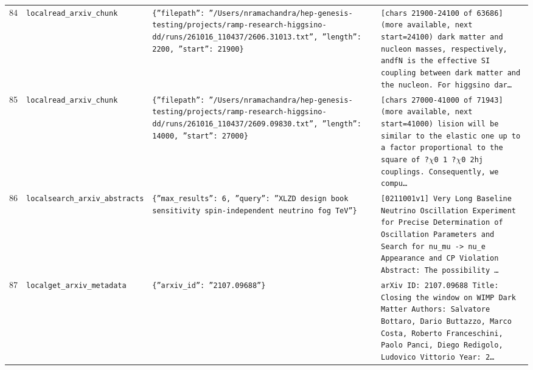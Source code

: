 \documentclass[11pt,a4paper]{article}
\begin{document}
\begin{longtable}{@{}p{}p{}p{}p{}@{}}
84 & \texttt{local}\newline\texttt{read\_\allowbreak{}arxiv\_\allowbreak{}chunk} & \texttt{\{''filepath'':\allowbreak{} ''/\allowbreak{}Users/\allowbreak{}nramachandra/\allowbreak{}hep-genesis-testing/\allowbreak{}projects/\allowbreak{}ramp-research-higgsino-dd/\allowbreak{}runs/\allowbreak{}261016\_\allowbreak{}110437/\allowbreak{}2606.31013.txt'',\allowbreak{} ''length'':\allowbreak{} 2200,\allowbreak{} ''start'':\allowbreak{} 21900\}\allowbreak{}} & \texttt{[chars 21900-24100 of 63686]\allowbreak{} (more available,\allowbreak{} next start=\allowbreak{}24100)\allowbreak{}   dark matter and nucleon masses,\allowbreak{} respectively,\allowbreak{} andfN is the effective SI coupling between dark matter and the nucleon. For higgsino dar\ldots{}\allowbreak{}} \\
85 & \texttt{local}\newline\texttt{read\_\allowbreak{}arxiv\_\allowbreak{}chunk} & \texttt{\{''filepath'':\allowbreak{} ''/\allowbreak{}Users/\allowbreak{}nramachandra/\allowbreak{}hep-genesis-testing/\allowbreak{}projects/\allowbreak{}ramp-research-higgsino-dd/\allowbreak{}runs/\allowbreak{}261016\_\allowbreak{}110437/\allowbreak{}2609.09830.txt'',\allowbreak{} ''length'':\allowbreak{} 14000,\allowbreak{} ''start'':\allowbreak{} 27000\}\allowbreak{}} & \texttt{[chars 27000-41000 of 71943]\allowbreak{} (more available,\allowbreak{} next start=\allowbreak{}41000)\allowbreak{}  lision will be similar to the elastic one up to a factor proportional to the square of ?$\chi$0 1 ?$\chi$0 2hj couplings. \textbullet{}\allowbreak{}Consequently,\allowbreak{} we compu\ldots{}\allowbreak{}} \\
86 & \texttt{local}\newline\texttt{search\_\allowbreak{}arxiv\_\allowbreak{}abstracts} & \texttt{\{''max\_\allowbreak{}results'':\allowbreak{} 6,\allowbreak{} ''query'':\allowbreak{} ''XLZD design book sensitivity spin-independent neutrino fog TeV''\}\allowbreak{}} & \texttt{[0211001v1]\allowbreak{} Very Long Baseline Neutrino Oscillation Experiment for Precise Determination of Oscillation Parameters and Search for nu\_\allowbreak{}mu -\textgreater{}\allowbreak{} nu\_\allowbreak{}e Appearance and CP Violation Abstract:\allowbreak{}   The possibility \ldots{}\allowbreak{}} \\
87 & \texttt{local}\newline\texttt{get\_\allowbreak{}arxiv\_\allowbreak{}metadata} & \texttt{\{''arxiv\_\allowbreak{}id'':\allowbreak{} ''2107.09688''\}\allowbreak{}} & \texttt{arXiv ID:\allowbreak{} 2107.09688 Title:\allowbreak{} Closing the window on WIMP Dark Matter Authors:\allowbreak{} Salvatore Bottaro,\allowbreak{} Dario Buttazzo,\allowbreak{} Marco Costa,\allowbreak{} Roberto Franceschini,\allowbreak{} Paolo Panci,\allowbreak{} Diego Redigolo,\allowbreak{} Ludovico Vittorio Year:\allowbreak{} 2\ldots{}\allowbreak{}} \\

\end{longtable}
\end{document}
